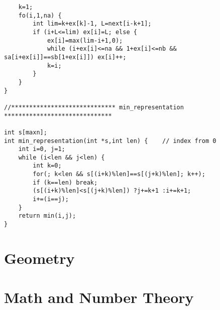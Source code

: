 \documentclass{article}
\begin{document}
\begin{lstlisting}
    k=1;
    fo(i,1,na) {
        int lim=k+ex[k]-1, L=next[i-k+1];
        if (i+L<=lim) ex[i]=L; else {
            ex[i]=max(lim-i+1,0);
            while (i+ex[i]<=na && 1+ex[i]<=nb && sa[i+ex[i]]==sb[1+ex[i]]) ex[i]++;
            k=i;
        }
    }
}

//***************************** min_representation ******************************

int s[maxn];
int min_representation(int *s,int len) {    // index from 0
    int i=0, j=1;
    while (i<len && j<len) {
        int k=0;
        for(; k<len && s[(i+k)%len]==s[(j+k)%len]; k++);
        if (k==len) break;
        (s[(i+k)%len]<s[(j+k)%len]) ?j+=k+1 :i+=k+1;
        i+=(i==j);
    }
    return min(i,j);
}
\end{lstlisting}

\section{Geometry}

\section{Math and Number Theory}
\end{document}
